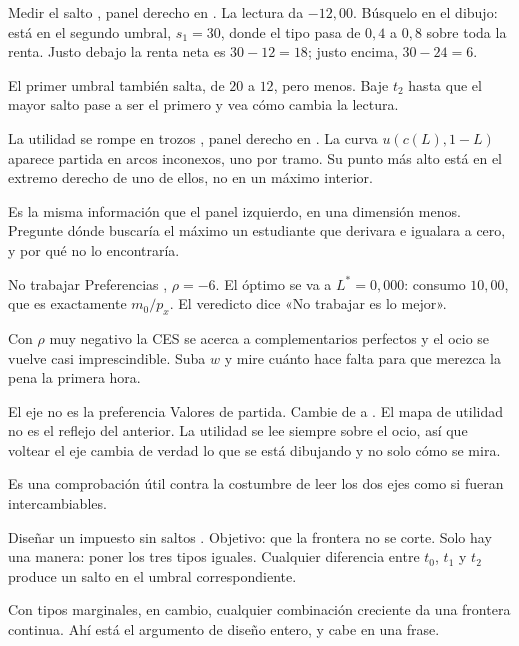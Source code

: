\documentclass[11pt,a4paper]{appletmanual}
\begin{document}
\begin{activity}{Medir el salto}
\amset {}, panel derecho en .
\amexp La lectura  da $-12{,}00$. Búsquelo en el dibujo: está
en el segundo umbral, $s_1 = 30$, donde el tipo pasa de $0{,}4$ a $0{,}8$ sobre
toda la renta. Justo debajo la renta neta es $30 - 12 = 18$; justo encima,
$30 - 24 = 6$.
\par\smallskip
El primer umbral también salta, de $20$ a $12$, pero menos. Baje $t_2$ hasta que
el mayor salto pase a ser el primero y vea cómo cambia la lectura.
\end{activity}

\begin{activity}{La utilidad se rompe en trozos}
\amset {}, panel derecho en .
\amexp La curva $u(c(L), 1-L)$ aparece partida en arcos inconexos, uno por
tramo. Su punto más alto está en el extremo derecho de uno de ellos, no en un
máximo interior.
\par\smallskip
Es la misma información que el panel izquierdo, en una dimensión menos.
Pregunte dónde buscaría el máximo un estudiante que derivara e igualara a cero,
y por qué no lo encontraría.
\end{activity}

\begin{activity}{No trabajar}
\amset Preferencias , $\rho = -6$.
\amexp El óptimo se va a $L^\ast = 0{,}000$: consumo $10{,}00$, que es
exactamente $m_0/p_x$. El veredicto dice «No trabajar es lo mejor».
\par\smallskip
Con $\rho$ muy negativo la CES se acerca a complementarios perfectos y el ocio
se vuelve casi imprescindible. Suba $w$ y mire cuánto hace falta para que
merezca la pena la primera hora.
\end{activity}

\begin{activity}{El eje no es la preferencia}
\amset Valores de partida. Cambie  de  a
.
\amexp El mapa de utilidad no es el reflejo del anterior. La utilidad se lee
siempre sobre el ocio, así que voltear el eje cambia de verdad lo que se está
dibujando y no solo cómo se mira.
\par\smallskip
Es una comprobación útil contra la costumbre de leer los dos ejes como si
fueran intercambiables.
\end{activity}

\begin{activity}{Diseñar un impuesto sin saltos}
\amset {}. Objetivo: que la frontera no se corte.
\amexp Solo hay una manera: poner los tres tipos iguales. Cualquier diferencia
entre $t_0$, $t_1$ y $t_2$ produce un salto en el umbral correspondiente.
\par\smallskip
Con tipos marginales, en cambio, cualquier combinación creciente da una
frontera continua. Ahí está el argumento de diseño entero, y cabe en una frase.
\end{activity}
\end{document}
